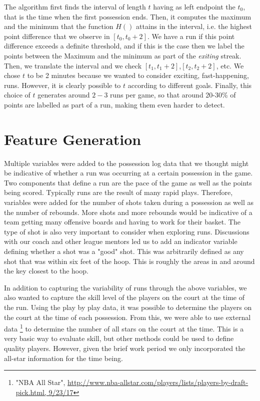 \documentclass{article}
\begin{document}
The algorithm first finds the interval of length $t$ having as left endpoint the $t_0$, that is the time when the first possession ends. Then, it computes the maximum and the minimum that the function $H()$ attains in the interval, i.e. the highest point difference that we observe in $[t_0,t_0+2]$. We have a run if this point difference exceeds a definite threshold, and if this is the case then we label the points between the Maximum and the minimum as part of the \textit{exiting} streak. Then, we translate the interval and we check $[t_1,t_1+2]$,$[t_2,t_2+2]$, etc. We chose $t$ to be 2 minutes because we wanted to consider exciting,  fast-happening, runs. However, it is clearly possible to $t$ according to different goals. Finally, this choice of $t$ generates around $2-3$ runs per game, so that around 20-30\% of points are labelled as part of a run, making them even harder to detect. 


\section{Feature Generation}

Multiple variables were added to the possession log data that we thought might be indicative of whether a run was occurring at a certain possession in the game.  Two components that define a run are the pace of the game as well as the points being scored. Typically runs are the result of many rapid plays. Therefore, variables were added for the number of shots taken during a possession as well as the number of rebounds. More shots and more rebounds would be indicative of a team getting many offensive boards and having to work for their basket. The type of shot is also very important to consider when exploring runs. Discussions with our coach and other league mentors led us to add an indicator variable defining whether a shot was a "good" shot. This was arbitrarily defined as any shot that was within six feet of the hoop. This is roughly the areas in and around the key closest to the hoop. \newline

In addition to capturing the variability of runs through the above variables, we also wanted to capture the skill level of the players on the court at the time of the run. Using the play by play data, it was possible to determine the players on the court at the time of each possession. From this, we were able to use external data \footnote{"NBA All Star", \url{http://www.nba-allstar.com/players/lists/players-by-draft-pick.html, 9/23/17}} to determine the number of all stars on the court at the time. This is a very basic way to evaluate skill, but other methods could be used to define quality players. However, given the brief work period we only incorporated the all-star information for the time being. 
\end{document}
